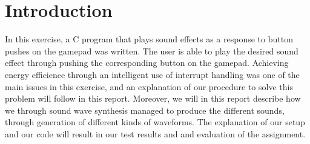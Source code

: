 \section{Introduction}

In this exercise, a C program that plays sound effects as a response to button pushes on the gamepad was written. 
The user is able to play the desired sound effect through pushing the corresponding button on the gamepad.
Achieving energy efficience through an intelligent use of interrupt handling was one of the main issues in this exercise, and an explanation of our procedure to solve this problem will follow in this report.
Moreover, we will in this report describe how we through sound wave synthesis managed to produce the different sounds, through generation of different kinds of waveforms.
The explanation of our setup and our code will result in our test results and and evaluation of the assignment.
